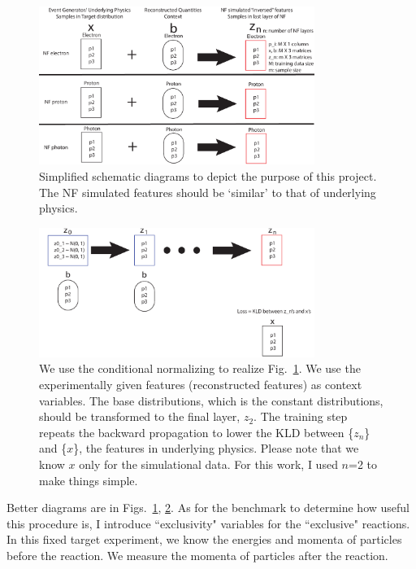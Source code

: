 \begin{figure}[htb]
    \centering
    \includegraphics[width=0.8\textwidth]{Chapters/Ch3-Simulations/normalizing_flows/pics/MeetingFigures/Sangbaek/NFdiag1.pdf}
    \caption[Placeholder Short text]{Simplified schematic diagrams to depict the purpose of this project. The NF simulated features should be `similar' to that of underlying physics.}
    \label{fig:goal}
\end{figure}
\begin{figure}[htb]
    \centering
    \includegraphics[width=0.8\textwidth]{Chapters/Ch3-Simulations/normalizing_flows/pics/MeetingFigures/Sangbaek/NFdiag2.pdf}
    \caption[Placeholder Short text]{We use the conditional normalizing to realize Fig.~\ref{fig:goal}. We use the experimentally given features (reconstructed features) as context variables. The base distributions, which is the constant distributions, should be transformed to the final layer, $z_2$. The training step repeats the backward propagation to lower the KLD between \{$z_n$\} and \{$x$\}, the features in underlying physics. Please note that we know $x$ only for the simulational data. For this work, I used $n$=2 to make things simple.}
    \label{fig:architecture}
\end{figure}

Better diagrams are in Figs.~\ref{fig:goal}, \ref{fig:architecture}. As for the benchmark to determine how useful this procedure is, I introduce ``exclusivity" variables for the ``exclusive" reactions. In this fixed target experiment, we know the energies and momenta of particles before the reaction. We measure the momenta of particles after the reaction.

